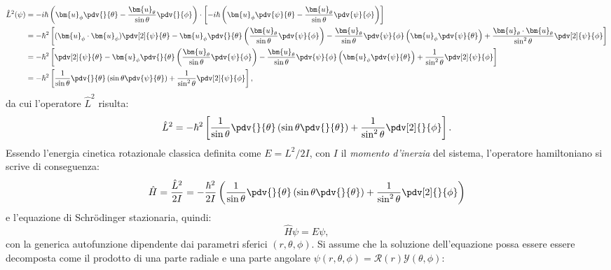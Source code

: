 \documentclass[a4paper,11pt]{report}
\begin{document}
\begin{equation}
\begin{aligned}
    \hat{L}^2 (\psi) &= -i\hbar \left( \bm{u}_{\phi} \pdv{}{\theta} - \frac{\bm{u}_{\theta}}{\sin\theta} \pdv{}{\phi} \right) \cdot \left[ -i\hbar \left( \bm{u}_{\phi} \pdv{\psi}{\theta} - \frac{\bm{u}_{\theta}}{\sin\theta} \pdv{\psi}{\phi} \right) \right] \\
    &= -\hbar^2 \left[ (\bm{u}_{\phi} \cdot \bm{u}_{\phi})\pdv[2]{\psi}{\theta} - \bm{u}_{\phi} \pdv{}{\theta}\left(\frac{\bm{u}_{\theta}}{\sin\theta} \pdv{\psi}{\phi}\right) - \frac{\bm{u}_{\theta}}{\sin\theta} \pdv{\psi}{\phi} \left(\bm{u}_{\phi} \pdv{\psi}{\theta}\right) + \frac{\bm{u}_{\theta} \cdot \bm{u}_{\theta}}{\sin^2\theta}\pdv[2]{\psi}{\phi}\right] \\
    &= -\hbar^2 \left[\pdv[2]{\psi}{\theta} - \bm{u}_{\phi} \pdv{}{\theta}\left(\frac{\bm{u}_{\theta}}{\sin\theta} \pdv{\psi}{\phi}\right) - \frac{\bm{u}_{\theta}}{\sin\theta} \pdv{\psi}{\phi} \left(\bm{u}_{\phi} \pdv{\psi}{\theta}\right) + \frac{1}{\sin^2\theta}\pdv[2]{\psi}{\phi}\right] \\
    &= -\hbar^2\left[ \frac{1}{\sin\theta}\pdv{}{\theta}\left( \sin\theta\pdv{\psi}{\theta} \right)+ \frac{1}{\sin^2\theta}\pdv[2]{\psi}{\phi} \right],
\end{aligned}
\end{equation}
da cui l'operatore $\hat{L}^2$ risulta:
\begin{equation}
\hat{L}^2 = -\hbar^2 \left[ \frac{1}{\sin\theta}\pdv{}{\theta}\left( \sin\theta\pdv{}{\theta} \right)+ \frac{1}{\sin^2\theta}\pdv[2]{}{\phi} \right].
\end{equation}
Essendo l'energia cinetica rotazionale classica definita come $E = L^2/2I$, con $I$ il \textit{momento d'inerzia} del sistema, l'operatore hamiltoniano si scrive di conseguenza:
\begin{equation}
\hat{H} = \frac{\hat{L}^2}{2I} = -\frac{\hbar^2}{2I} \left( \frac{1}{\sin\theta}\pdv{}{\theta}\left( \sin\theta\pdv{}{\theta} \right)+ \frac{1}{\sin^2\theta}\pdv[2]{}{\phi} \right)
\end{equation}
e l'equazione di Schrödinger stazionaria, quindi:
\begin{equation}
\hat{H} \psi = E\psi,
\end{equation}
con la generica autofunzione dipendente dai parametri sferici $(r,\theta,\phi)$. Si assume che la soluzione dell'equazione possa essere essere decomposta come il prodotto di una parte radiale e una parte angolare $\psi(r,\theta,\phi) = \mathcal{R}({r})\mathcal{Y}(\theta,\phi)$:
\end{document}
